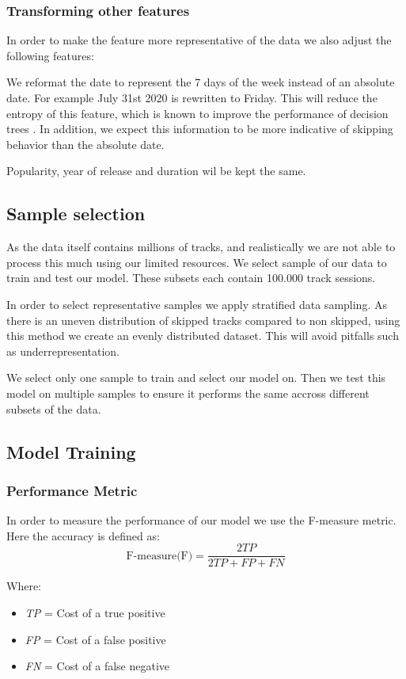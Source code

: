 \documentclass[conference]{IEEEtran}
\begin{document}
\subsubsection{Transforming other features}
In order to make the feature more representative of the data we also adjust the following features:

We reformat the date to represent the 7 days of the week instead of an absolute date. 
For example July 31st 2020 is rewritten to Friday. 
This will reduce the entropy of this feature, which is known to improve the 
performance of decision trees \cite{b1}. 
In addition, we expect this information to be more indicative of skipping behavior
than the absolute date.

Popularity, year of release and duration wil be kept the same.

\subsection{Sample selection}
As the data itself contains millions of tracks, and realistically we are not able to 
process this much using our limited resources. We select sample of our data
to train and test our model. 
These subsets each contain 100.000 track sessions. 

In order to select representative samples we apply stratified data sampling. 
As there is an uneven distribution of skipped tracks compared to non skipped, using this method we create an evenly distributed dataset. 
This will avoid pitfalls such as underrepresentation.

We select only one sample to train and select our model on. 
Then we test this model on multiple samples to ensure it performs the same 
accross different subsets of the data.

\subsection{Model Training}
\subsubsection{Performance Metric}
In order to measure the performance of our model we use the F-measure metric.
Here the accuracy is defined as:
\[
	\text{F-measure(F)} = \frac{2 \textit{TP}}{2 \textit{TP} + \textit{FP} + \textit{FN}}
\]

Where:
\begin{itemize}
	\item \textit{TP} = Cost of a true positive
	\item \textit{FP} = Cost of a false positive
	\item \textit{FN} = Cost of a false negative
\end{itemize}
\end{document}
